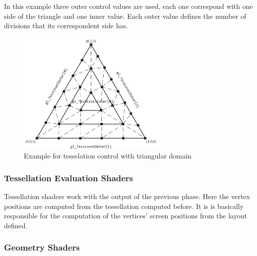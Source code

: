 In this example three outer control values are used, each one correspond with one side of the triangle and one inner value. Each outer value defines the number of divisions that its correspondent side has. 

\begin{figure}[htbp]
	\centering
	\includegraphics[width=0.65\textwidth]{img/OpenGL/TessShaderEx1.png}
	\caption{Example for tesselation control with triangular domain \cite{shreiner2013opengl}}
	\label{fig:ex1TessControl}
\end{figure}




\subsubsection{Tessellation Evaluation Shaders} %
\label{ssub:tesselation_evaluation_shaders}
Tessellation shaders work with the output of the previous phase. Here the vertex positions are computed from the tessellation computed before. It is is basically responsible for the computation of the vertices' screen positions from the layout defined.



\subsubsection{Geometry Shaders} %
\label{sub:geometriy_shaders}

